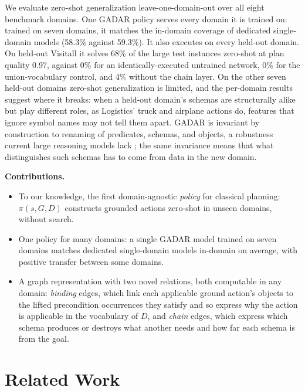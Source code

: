 \documentclass{article} %
\newcommand{\gadar}{GADAR}                 %
\newcommand{\todonum}[1]{#1}
\begin{document}
We evaluate zero-shot generalization leave-one-domain-out over all eight
benchmark domains. One \gadar{} policy serves every domain it is trained on:
trained on seven domains, it matches the in-domain coverage of dedicated
single-domain models (58.3\% against 59.3\%). It also executes on every
held-out domain. On held-out
Visitall it solves \todonum{68}\% of the large test instances zero-shot at
plan quality \todonum{0.97}, against \todonum{0}\% for an
identically-executed untrained network, \todonum{0}\% for the
union-vocabulary control, and \todonum{4}\% without the chain layer. On the
other seven held-out domains zero-shot generalization is limited, and the per-domain
results suggest where it breaks: when a held-out domain's schemas are
structurally alike but play different roles, as Logistics' truck and
airplane actions do, features that ignore symbol names may not tell them
apart. \gadar{} is invariant by construction to renaming of predicates,
schemas, and objects, a robustness current large reasoning models lack
\citep{llm_baseline}; the same invariance means that what distinguishes
such schemas has to come from data in the new domain.

\textbf{Contributions.}
\begin{itemize}
\item To our knowledge, the first domain-agnostic \emph{policy} for
  classical planning: $\pi(s, G, D)$ constructs grounded actions zero-shot
  in unseen domains, without search.
\item One policy for many domains: a single \gadar{} model trained on seven
  domains matches dedicated single-domain models in-domain on average, with
  positive transfer between some domains.
\item A graph representation with two novel relations, both computable in
  any domain: \emph{binding} edges, which link each applicable ground
  action's objects to the lifted precondition occurrences they satisfy and
  so express why the action is applicable in the vocabulary of $D$, and \emph{chain} edges,
  which express which schema produces or destroys what another needs and
  how far each schema is from the goal.
\end{itemize}

\section{Related Work}
\end{document}

